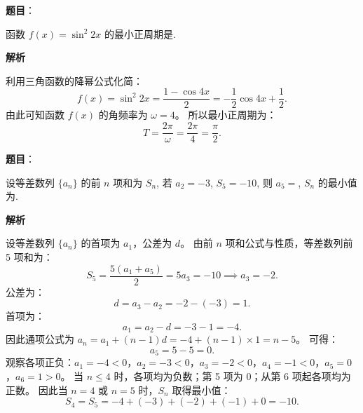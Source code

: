 \begin{answer}

\textbf{题目}：

函数 $f(x) = \sin^2 2x$ 的最小正周期是\gkblank{}.

\textbf{解析}

利用三角函数的降幂公式化简：
\nopagebreak[4]
\[f(x) = \sin^2 2x = \frac{1 - \cos 4x}{2} = -\frac{1}{2}\cos 4x + \frac{1}{2}.\]
由此可知函数 $f(x)$ 的角频率为 $\omega = 4$。
所以最小正周期为：
\nopagebreak[4]
\[T = \frac{2\pi}{\omega} = \frac{2\pi}{4} = \frac{\pi}{2}.\]


\end{answer}
\begin{answer}

\textbf{题目}：

设等差数列 $\{a_n\}$ 的前 $n$ 项和为 $S_n$, 若 $a_2 = -3$, $S_5 = -10$, 则 $a_5 =$\gkblank{}, $S_n$ 的最小值为\gkblank{}.

\textbf{解析}

设等差数列 $\{a_n\}$ 的首项为 $a_1$，公差为 $d$。
由前 $n$ 项和公式与性质，等差数列前 5 项和为：
\nopagebreak[4]
\[S_5 = \frac{5(a_1 + a_5)}{2} = 5a_3 = -10 \implies a_3 = -2.\]
公差为：
\nopagebreak[4]
\[d = a_3 - a_2 = -2 - (-3) = 1.\]
首项为：
\nopagebreak[4]
\[a_1 = a_2 - d = -3 - 1 = -4.\]
因此通项公式为 $a_n = a_1 + (n - 1)d = -4 + (n - 1) \times 1 = n - 5$。
可得：
\nopagebreak[4]
\[a_5 = 5 - 5 = 0.\]
观察各项正负：$a_1 = -4 < 0$，$a_2 = -3 < 0$，$a_3 = -2 < 0$，$a_4 = -1 < 0$，$a_5 = 0$，$a_6 = 1 > 0$。
当 $n \leqslant 4$ 时，各项均为负数；第 5 项为 0；从第 6 项起各项均为正数。
因此当 $n = 4$ 或 $n = 5$ 时，$S_n$ 取得最小值：
\nopagebreak[4]
\[S_4 = S_5 = -4 + (-3) + (-2) + (-1) + 0 = -10.\]


\end{answer}
